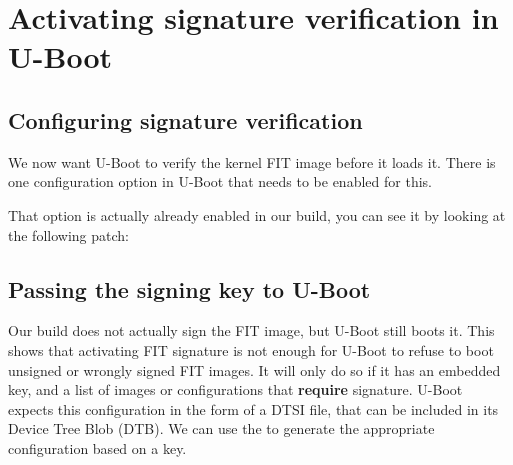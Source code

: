 
\section{Activating signature verification in U-Boot}

\subsection{Configuring signature verification}

We now want U-Boot to verify the kernel FIT image before it loads it.
There is one configuration option in U-Boot that needs to be enabled for this.

That option is actually already enabled in our build, you can see it by looking at
the following patch:

\begin{bashinput}
\end{bashinput}

\subsection{Passing the signing key to U-Boot}

Our build does not actually sign the FIT image, but U-Boot still boots it.
This shows that activating FIT signature is not enough for U-Boot to refuse to boot unsigned or wrongly signed 
FIT images.
It will only do so if it has an embedded key, and a list of images or configurations that \textbf{require} signature.
U-Boot expects this configuration in the form of a DTSI file, that can be included in its Device Tree Blob (DTB).
We can use the  to generate the appropriate configuration based on a key.

